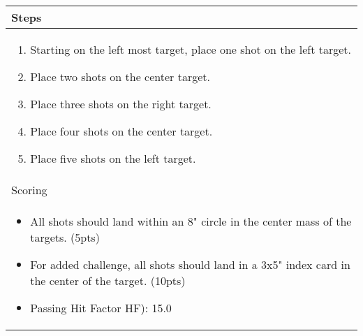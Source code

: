 \documentclass[../Cover.tex]{subfiles}
\begin{document}
	\begin{tabular}{ | p{} |}
		\hline
		Steps\\ 
		\hline
		\tiny \begin{enumerate}[topsep=0pt, partopsep=0pt]
			\item Starting on the left most target, place one shot on the left target.
			\item Place two shots on the center target.
			\item Place three shots on the right target.
			\item Place four shots on the center target.
			\item Place five shots on the left target.
		\end{enumerate}		
		\\ [0.25\textheight]
		\hline
		Scoring \\
		\hline
		\tiny \begin{itemize}[topsep=0pt, partopsep=0pt]
			\item All shots should land within an 8" circle in the center mass of the targets. (5pts)
			\item For added challenge, all shots should land in a 3x5" index card in the center of the target. (10pts)
			\item Passing Hit Factor HF): 15.0
		\end{itemize}		
		\\ [0.25\textheight]
		\hline
	\end{tabular}
\end{document}
